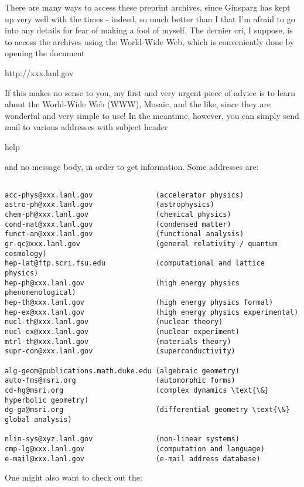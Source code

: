 There are many ways to access these preprint archives, since Ginsparg
has kept up very well with the times - indeed, so much better than I
that I'm afraid to go into any details for fear of making a fool of
myself.  The dernier cri, I suppose, is to access the archives
using the World-Wide Web, which is conveniently done by opening the
document

http://xxx.lanl.gov

If this makes no sense to you, my first and very urgent piece of advice
is to learn about the World-Wide Web (WWW), Mosaic, and the like, since
they are wonderful and very simple to use!  In the meantime, however,
you can simply send mail to various addresses with subject header

help

and no message body, in order to get information.  Some addresses are:


\begin{verbatim}

acc-phys@xxx.lanl.gov               (accelerator physics)
astro-ph@xxx.lanl.gov               (astrophysics)
chem-ph@xxx.lanl.gov                (chemical physics)
cond-mat@xxx.lanl.gov               (condensed matter)
funct-an@xxx.lanl.gov               (functional analysis)
gr-qc@xxx.lanl.gov                  (general relativity / quantum cosmology)
hep-lat@ftp.scri.fsu.edu            (computational and lattice physics)
hep-ph@xxx.lanl.gov                 (high energy physics phenomenological)
hep-th@xxx.lanl.gov                 (high energy physics formal)
hep-ex@xxx.lanl.gov                 (high energy physics experimental)
nucl-th@xxx.lanl.gov                (nuclear theory)
nucl-ex@xxx.lanl.gov                (nuclear experiment)
mtrl-th@xxx.lanl.gov                (materials theory)
supr-con@xxx.lanl.gov               (superconductivity)

alg-geom@publications.math.duke.edu (algebraic geometry)
auto-fms@msri.org                   (automorphic forms)
cd-hg@msri.org                      (complex dynamics \text{\&}  hyperbolic geometry)
dg-ga@msri.org                      (differential geometry \text{\&}  global analysis)

nlin-sys@xyz.lanl.gov               (non-linear systems)
cmp-lg@xxx.lanl.gov                 (computation and language)
e-mail@xxx.lanl.gov                 (e-mail address database)
\end{verbatim}
    

One might also want to check out the:

